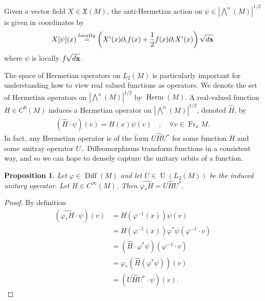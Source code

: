 \documentclass[12pt]{amsart}
\newtheorem{prop}{Proposition}
\DeclareMathOperator{\Diff}{Diff}
\DeclareMathOperator{\U}{U}
\DeclareMathOperator{\Fr}{Fr}
\DeclareMathOperator{\Herm}{Herm}
\begin{document}
Given a vector field $X \in \mathfrak{X}(M)$, the anti-Hermetian action on $\psi \in |\bigwedge^n(M)|^{1/2}$ is given in coordinates by
\begin{align*}
  X[\psi](x) \stackrel{locally}{=} \left( X^i(x) \partial_i f(x) + \frac{1}{2} f(x) \partial_iX^i(x) \right) \sqrt{d {\bf x} }
\end{align*}
where $\psi$ is locally $f \sqrt{d {\bf x}}$.

 The space of Hermetian operators on $L_2(M)$ is particularly important for understanding how to view real valued functions as operators.
   We denote the set of Hermetian operators on $| \bigwedge^n(M) |^{1/2}$ by $\Herm(M)$.
 A real-valued function $H \in C^0(M)$ induces a Hermetian operator
on $| \bigwedge^n(M)|^{1/2}$, denoted $\widehat{H}$, by
\begin{align*}
  (\widehat{H} \cdot \psi)(v) = H(x) \psi(v) \quad , \quad \forall v \in \Fr_x M.
\end{align*}
In fact, any Hermetian operator is of the form $U \hat{H} U^*$ for some function $H$ and some unitray operator $U$.\cite[Chapter VII]{ReedSimon1980}.
Diffeomorphisms transform functions in a consistent way, and so we can hope to densely capture the unitary orbits of a function.

\begin{prop}
  Let $\varphi \in \Diff(M)$ and let $U \in \U(L_2(M))$ be the induced unitary operator.  Let $H \in C^{\infty}(M)$.  Then $\widehat{ \varphi_*H} = U \hat{H} U^*$.
\end{prop}
\begin{proof}
  By definition
  \begin{align*}
    (\widehat{\varphi_*H} \cdot \psi )(v) &= H(\varphi^{-1}(x)) \psi(v) \\
    &= H(\varphi^{-1}(x)) \varphi^*\psi( \varphi^{-1} \cdot v) \\
    &= ( \hat{H} \cdot \varphi^* \psi)( \varphi^{-1} \cdot v) \\
    &= \varphi_* ( \hat{H}( \varphi^* \psi)) (v) \\
    &= (U\hat{H}U^* \cdot \psi) (v).
  \end{align*}
\end{proof}
\end{document}
